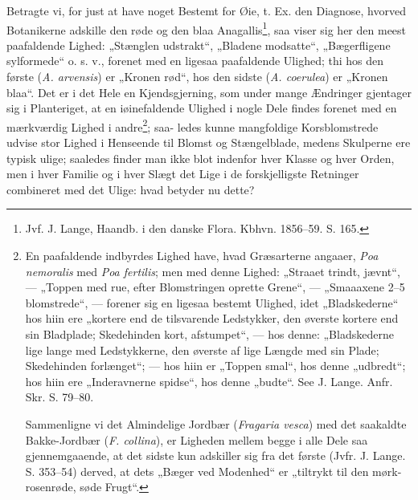 \documentclass[12pt,a4paper]{book}
\begin{document}
Betragte vi, for just at have noget Bestemt for Øie, t. Ex. den
Diagnose, hvorved Botanikerne adskille den røde og den blaa
Anagallis\footnote{Jvf. J. Lange, Haandb. i den danske Flora. Kbhvn.
1856--59. S. 165.}, saa viser sig her den meest paafaldende Lighed:
„Stænglen udstrakt“, „Bladene modsatte“, „Bægerfligene sylformede“
o. s. v., forenet med en ligesaa paafaldende Ulighed; thi hos den første
(\textit{A. arvensis}) er „Kronen rød“, hos den sidste
(\textit{A. coerulea}) er „Kronen blaa“. Det er i det Hele en
Kjendsgjerning, som under mange Ændringer gjentager sig i Planteriget,
at en iøinefaldende Ulighed i nogle Dele findes forenet med en
mærkværdig Lighed i andre\footnote{En paafaldende indbyrdes Lighed have,
hvad Græsarterne angaaer, \textit{Poa nemoralis} med \textit{Poa
fertilis}; men med denne Lighed: „Straaet trindt, jævnt“, --- „Toppen
med rue, efter Blomstringen oprette Grene“, --- „Smaaaxene 2--5
blomstrede“, --- forener sig en ligesaa bestemt Ulighed, idet
„Bladskederne“ hos hiin ere „kortere end de tilsvarende Ledstykker, den
øverste kortere end sin Bladplade; Skedehinden kort, afstumpet“, --- hos
denne: „Bladskederne lige lange med Ledstykkerne, den øverste af lige
Længde med sin Plade; Skedehinden forlænget“; --- hos hiin er „Toppen
smal“, hos denne „udbredt“; hos hiin ere „Inderavnerne spidse“, hos
denne „budte“. See J. Lange. Anfr. Skr. S. 79--80.

Sammenligne vi det Almindelige Jordbær (\textit{Fragaria vesca}) med det
saakaldte Bakke-Jordbær (\textit{F. collina}), er Ligheden mellem begge
i alle Dele saa gjennemgaaende, at det sidste kun adskiller sig fra det
første (Jvfr. J. Lange. S. 353--54) derved, at dets „Bæger ved
Modenhed“ er „tiltrykt til den mørk-rosenrøde, søde Frugt“.}; saa-
ledes kunne mangfoldige Korsblomstrede udvise stor Lighed i Henseende
til Blomst og Stængelblade, medens Skulperne ere typisk ulige; saaledes
finder man ikke blot indenfor hver Klasse og hver Orden, men i hver
Familie og i hver Slægt det Lige i de forskjelligste Retninger
combineret med det Ulige: hvad betyder nu dette?
\end{document}
